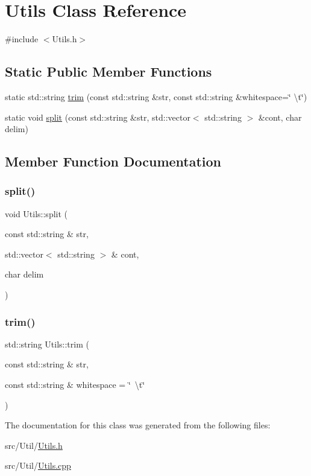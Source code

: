 \hypertarget{classUtils}{}\section{Utils Class Reference}
\label{classUtils}


{\ttfamily \#include $<$Utils.\+h$>$}

\subsection*{Static Public Member Functions}
\begin{DoxyCompactItemize}
\item 
static std\+::string \mbox{\hyperlink{classUtils_ad756a5d8d8d2fdd6365f586886a35e7f}{trim}} (const std\+::string \&str, const std\+::string \&whitespace=\char`\"{} \textbackslash{}t\char`\"{})
\item 
static void \mbox{\hyperlink{classUtils_a19b4ed7e56936c65ab954cf6904c531a}{split}} (const std\+::string \&str, std\+::vector$<$ std\+::string $>$ \&cont, char delim)
\end{DoxyCompactItemize}


\subsection{Member Function Documentation}
\mbox{\label{classUtils_a19b4ed7e56936c65ab954cf6904c531a}} 
\subsubsection{\texorpdfstring{split()}{split()}}
{\footnotesize\ttfamily void Utils\+::split (\begin{DoxyParamCaption}\item[{const std\+::string \&}]{str,  }\item[{std\+::vector$<$ std\+::string $>$ \&}]{cont,  }\item[{char}]{delim }\end{DoxyParamCaption})\hspace{0.3cm}{\ttfamily [static]}}

\mbox{\label{classUtils_ad756a5d8d8d2fdd6365f586886a35e7f}} 
\subsubsection{\texorpdfstring{trim()}{trim()}}
{\footnotesize\ttfamily std\+::string Utils\+::trim (\begin{DoxyParamCaption}\item[{const std\+::string \&}]{str,  }\item[{const std\+::string \&}]{whitespace = {\ttfamily \char`\"{}~\textbackslash{}t\char`\"{}} }\end{DoxyParamCaption})\hspace{0.3cm}{\ttfamily [static]}}



The documentation for this class was generated from the following files\+:\begin{DoxyCompactItemize}
\item 
src/\+Util/\mbox{\hyperlink{Utils_8h}{Utils.\+h}}\item 
src/\+Util/\mbox{\hyperlink{Utils_8cpp}{Utils.\+cpp}}\end{DoxyCompactItemize}
